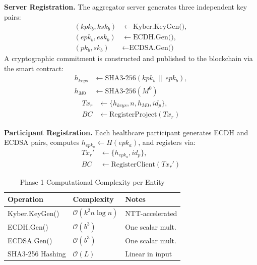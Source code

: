 \documentclass[journal, 10pt, twocolumn]{IEEEtran}
\begin{document}
\textbf{Server Registration.} The aggregator server generates three independent key pairs:
\begin{equation}
\begin{split}
(kpk_b, ksk_b) &\leftarrow \text{Kyber.KeyGen()}, \\
(epk_b, esk_b) &\leftarrow \text{ECDH.Gen()}, \\
(pk_b, sk_b) &\leftarrow \text{ECDSA.Gen()}
\end{split}
\label{eq:server_keygen}
\end{equation}
A cryptographic commitment is constructed and published to the blockchain via the smart contract:
\begin{equation}    
\begin{split}
h_{keys} &\leftarrow \text{SHA3-256}(kpk_b \,\|\, epk_b), \\
h_{M0} &\leftarrow \text{SHA3-256}(M^0)
\end{split}
\label{eq:server_hash}
\end{equation}
\begin{equation}
\begin{split}
Tx_r &\leftarrow \{h_{keys}, n, h_{M0}, id_p\}, \\
BC &\leftarrow \text{RegisterProject}(Tx_r)
\end{split}
\label{eq:server_register}
\end{equation}

\textbf{Participant Registration.} Each healthcare participant generates ECDH and ECDSA pairs, computes $h_{epk_a} \leftarrow H(epk_a)$, and registers via:
\begin{equation}
\begin{split}
Tx_r' &\leftarrow \{h_{epk_a}, id_p\}, \\
BC &\leftarrow \text{RegisterClient}(Tx_r')
\end{split}
\label{eq:client_register}
\end{equation}

\begin{table}[H]
\centering
\caption{Phase 1 Computational Complexity per Entity}
\label{tab:phase1_complexity}
\begin{tabular}{l l l}
\toprule
\textbf{Operation} & \textbf{Complexity} & \textbf{Notes} \\
\midrule
Kyber.KeyGen() & $\mathcal{O}(k^2 n \log n)$ & NTT-accelerated \\
ECDH.Gen() & $\mathcal{O}(b^3)$ & One scalar mult. \\
ECDSA.Gen() & $\mathcal{O}(b^3)$ & One scalar mult. \\
SHA3-256 Hashing & $\mathcal{O}(L)$ & Linear in input \\
\bottomrule
\end{tabular}
\end{table}
\end{document}
